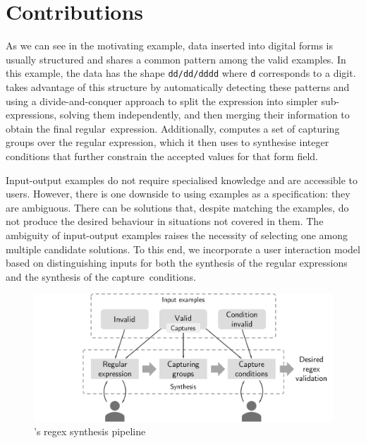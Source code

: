 \section{Contributions}

As we can see in the motivating example, data inserted into digital forms is usually structured and shares a common pattern among the valid examples.
In this example, the data has the shape \texttt{dd/dd/dddd} where \texttt{d} corresponds to a digit. 
\Forest takes advantage of this structure by automatically detecting these patterns and using a divide-and-conquer approach to split the expression into simpler sub-expressions, solving them independently, and then merging their information to obtain the final regular~expression.
Additionally, \Forest computes a set of capturing groups over the regular expression, which it then uses to synthesise integer conditions that further constrain the accepted values for that form field.

Input-output examples do not require specialised knowledge and are accessible to users.
However, there is one downside to using examples as a specification: they are ambiguous. There can be solutions that, despite matching the examples, do not produce the desired behaviour in situations not covered in them.
The ambiguity of input-output examples raises the necessity of selecting one among multiple candidate solutions.
%
To this end, we incorporate a user interaction model based on distinguishing inputs
for both the synthesis of the regular expressions and the synthesis of the capture~conditions. 

\begin{figure}
    \centering
    \includegraphics[scale=.35]{pictures/regex_synthesis_h.pdf}
    \caption{\Forest's regex synthesis pipeline}
    \label{fig:regex-synthesis}
\end{figure}

